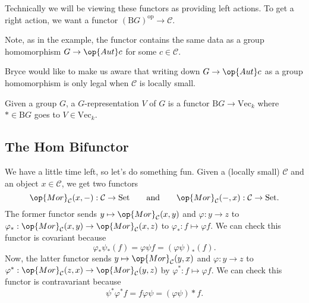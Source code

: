 \documentclass[../notes.tex]{subfiles}
\begin{document}
\begin{remark}
	Technically we will be viewing these functors as providing left actions. To get a right action, we want a functor $(\mathrm BG)^\mathrm{op}\to\mathcal C$.
\end{remark}
Note, as in the example, the functor contains the same data as a group homomorphism $G\to\op{Aut}c$ for some $c\in\mathcal C$.
\begin{remark}
	Bryce would like to make us aware that writing down $G\to\op{Aut}c$ as a group homomorphism is only legal when $\mathcal C$ is locally small.
\end{remark}
\begin{example}
	Given a group $G$, a $G$-representation $V$ of $G$ is a functor $\mathrm BG\to\mathrm{Vec}_k$ where $*\in\mathrm BG$ goes to $V\in\mathrm{Vec}_k$.
\end{example}

\subsection{The \textrm{Hom} Bifunctor}
We have a little time left, so let's do something fun. Given a (locally small) $\mathcal C$ and an object $x\in\mathcal C$, we get two functors
\[\op{Mor}_\mathcal C(x,-):\mathcal C\to\mathrm{Set}\qquad\text{and}\qquad\op{Mor}_\mathcal C(-,x):\mathcal C\to\mathrm{Set}.\]
The former functor sends $y\mapsto\op{Mor}_\mathcal C(x,y)$ and $\varphi:y\to z$ to $\varphi_*:\op{Mor}_\mathcal C(x,y)\to\op{Mor}_\mathcal C(x,z)$ to $\varphi_*:f\mapsto\varphi f$. We can check this functor is covariant because
\[\varphi_*\psi_*(f)=\varphi\psi f=(\varphi\psi)_*(f).\]
Now, the latter functor sends $y\mapsto\op{Mor}_\mathcal C(y,x)$ and $\varphi:y\to z$ to $\varphi^*:\op{Mor}_\mathcal C(z,x)\to\op{Mor}_\mathcal C(y,z)$ by $\varphi^*:f\mapsto\varphi f$. We can check this functor is contravariant because
\[\psi^*\varphi^*f=f\varphi\psi=(\varphi\psi)*f.\]
\end{document}
